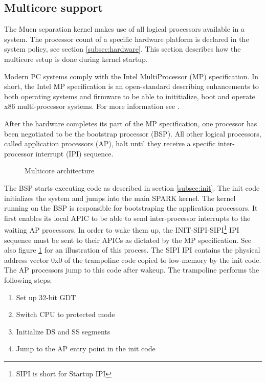 \subsection{Multicore support}\label{subsec:mp-support}
The Muen separation kernel makes use of all logical processors available in a
system. The processor count of a specific hardware platform is declared in the
system policy, see section \ref{subsec:hardware}. This section describes how
the multicore setup is done during kernel startup.

Modern PC systems comply with the Intel MultiProcessor (MP)
specification. In short, the Intel MP specification is an open-standard
describing enhancements to both operating systems and firmware to be able to
inititialize, boot and operate x86 multi-processor systems. For more information
see \cite{intel:mp}.

After the hardware completes its part of the MP specification, one processor
has been negotiated to be the bootstrap processor (BSP). All other
logical processors, called application processors (AP), halt until
they receive a specific inter-processor interrupt (IPI) sequence.

\begin{figure}[h]
	\centering
	
	\caption{Multicore architecture}
	\label{fig:mp-overview}
\end{figure}

The BSP starts executing code as described in section \ref{subsec:init}. The
init code initializes the system and jumps into the main SPARK kernel. The
kernel running on the BSP is responsible for bootstraping the application
processors. It first enables its local APIC to be able to send
inter-processor interrupts to the waiting AP processors. In order to wake them
up, the INIT-SIPI-SIPI\footnote{SIPI is short for Startup
IPI} IPI sequence must be sent to their
APICs as dictated by the MP specification. See also figure
\ref{fig:mp-overview} for an illustration of this process. The SIPI IPI
contains the physical address vector 0x0 of the trampoline code copied to
low-memory by the init code. The AP processors jump to this code after wakeup.
The trampoline performs the following steps:

\begin{enumerate}
	\item Set up 32-bit GDT
	\item Switch CPU to protected mode
	\item Initialize DS and SS segments
	\item Jump to the AP entry point in the init code
\end{enumerate}

